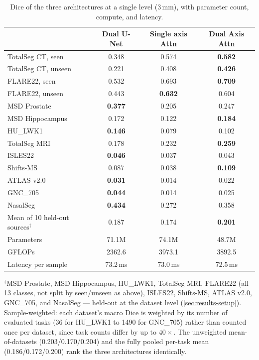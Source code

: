 \documentclass[hidelinks, a4paper, 12pt, ngerman, english]{article}  %
\begin{document}
\begin{table}[t]
  \centering
  \small
  \caption{Dice of the three architectures at a single level (3\,mm), with
  parameter count, compute, and latency.}
  \label{tab:fusion-staircase}
  \begin{tabular}{@{}lccc@{}}
    \toprule
    & Dual U-Net & Single axis Attn & Dual Axis Attn \\
    \midrule
    TotalSeg CT, seen      & 0.348 & 0.574 & \textbf{0.582} \\
    TotalSeg CT, unseen    & 0.221 & 0.408 & \textbf{0.426} \\
    FLARE22, seen          & 0.532 & 0.693 & \textbf{0.709} \\
    FLARE22, unseen        & 0.443 & \textbf{0.632} & 0.604 \\
    \midrule
    MSD Prostate           & \textbf{0.377} & 0.205 & 0.247 \\
    MSD Hippocampus        & 0.172 & 0.122 & \textbf{0.184} \\
    \midrule
    HU\_LWK1               & \textbf{0.146} & 0.079 & 0.102 \\
    \midrule
    TotalSeg MRI           & 0.178 & 0.232 & \textbf{0.259} \\
    \midrule
    ISLES22                & \textbf{0.046} & 0.037 & 0.043 \\
    Shifts-MS               & 0.087 & 0.038 & \textbf{0.109} \\
    ATLAS v2.0              & \textbf{0.031} & 0.014 & 0.022 \\
    GNC\_705                & \textbf{0.044} & 0.014 & 0.025 \\
    NasalSeg                & \textbf{0.434} & 0.272 & 0.358 \\
    \midrule
    Mean of 10 held-out sources$^{\dagger}$ & 0.187 & 0.174 & \textbf{0.201} \\
    \midrule
    Parameters             & 71.1M  & 74.1M  & 48.7M  \\
    GFLOPs                 & 2362.6 & 3973.1 & 3892.5 \\
    Latency per sample     & 73.2\,ms & 73.0\,ms & 72.5\,ms \\
    \bottomrule
  \end{tabular}
  \par\vspace{0.5em}
  \raggedright\footnotesize
  $^{\dagger}$MSD Prostate, MSD Hippocampus, HU\_LWK1, TotalSeg MRI, FLARE22
  (all 13 classes, not split by seen/unseen as above), ISLES22, Shifts-MS,
  ATLAS v2.0, GNC\_705, and NasalSeg — held-out at the dataset level
  (\autoref{sec:results-setup}). Sample-weighted: each dataset's macro Dice is
  weighted by its number of evaluated tasks (36 for HU\_LWK1 to 1490 for
  GNC\_705) rather than counted once per dataset, since task counts differ by
  up to $40\times$. The unweighted mean-of-datasets (0.203/0.170/0.204) and
  the fully pooled per-task mean (0.186/0.172/0.200) rank the three
  architectures identically.
\end{table}
\end{document}

